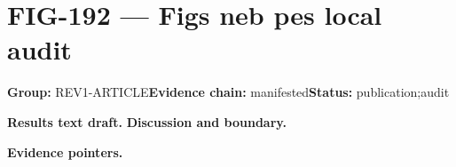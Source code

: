 \clearpage
\section{FIG-192 --- Figs neb pes local audit}
\label{figpage:fig-192}
\textbf{Group:} REV1-ARTICLE\quad \textbf{Evidence chain:} manifested\quad \textbf{Status:} publication;audit

\textbf{Results text draft.} 
\textbf{Discussion and boundary.} 


\textbf{Evidence pointers.}



\vfill
